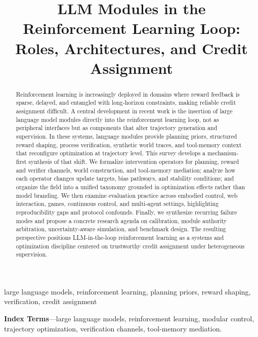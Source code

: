 ﻿\documentclass[conference]{IEEEtran}
\begin{document}
\title{
LLM Modules in the Reinforcement Learning Loop: Roles, Architectures, and Credit Assignment
}

\author{
}

\maketitle

\begin{abstract}
Reinforcement learning is increasingly deployed in domains where reward feedback is sparse, delayed, and entangled with long-horizon constraints, making reliable credit assignment difficult. A central development in recent work is the insertion of large language model modules directly into the reinforcement learning loop, not as peripheral interfaces but as components that alter trajectory generation and supervision. In these systems, language modules provide planning priors, structured reward shaping, process verification, synthetic world traces, and tool-memory context that reconfigure optimization at trajectory level. This survey develops a mechanism-first synthesis of that shift. We formalize intervention operators for planning, reward and verifier channels, world construction, and tool-memory mediation; analyze how each operator changes update targets, bias pathways, and stability conditions; and organize the field into a unified taxonomy grounded in optimization effects rather than model branding. We then examine evaluation practice across embodied control, web interaction, games, continuous control, and multi-agent settings, highlighting reproducibility gaps and protocol confounds. Finally, we synthesize recurring failure modes and propose a concrete research agenda on calibration, module authority arbitration, uncertainty-aware simulation, and benchmark design. The resulting perspective positions LLM-in-the-loop reinforcement learning as a systems and optimization discipline centered on trustworthy credit assignment under heterogeneous supervision.
\end{abstract}

\begin{IEEEkeywords}
large language models, reinforcement learning, planning priors, reward shaping, verification, credit assignment
\end{IEEEkeywords}

\noindent\textbf{Index Terms}---large language models, reinforcement learning, modular control, trajectory optimization, verification channels, tool-memory mediation.
\end{document}
